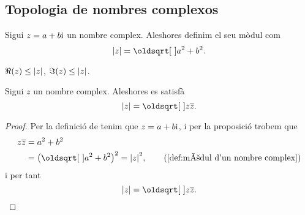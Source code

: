 \documentclass[../../Main.tex]{subfiles}
\begin{document}
	\subsection{Topologia de nombres complexos}
	\begin{definition}
        \label{def:mòdul d'un nombre complex}
		Sigui \(z = a+b\mathrm{i}\) un nombre complex.
        Aleshores definim el seu mòdul com
		\[
            \modul{z} = \sqrt{a^{2}+b^{2}}.
        \]
	\end{definition}
	\begin{observation}
		\label{obs:les parts real i imaginàries d'un complex són menors que el seu mòdul}
		\label{obs:la part real d'un complex és menor que el seu mòdul}
		\label{obs:la part imaginària d'un complex és menor que el seu mòdul}
		\(\Re(z) \leq \modul{z}\), \(\Im(z) \leq \modul{z}\).
	\end{observation}
	\begin{proposition}
		\label{prop:el mòdul d'un nombre complex és l'arrel del nombre pel seu conjugat}
		Sigui \(z\) un nombre complex.
        Aleshores es satisfà
		\[
            \modul{z} = \sqrt{z\conjugat{z}}.
        \]
		\begin{proof}
			Per la definició de  tenim
            que \(z = a+b\mathrm{i}\), i per la
            proposició 
            trobem que
			\begin{align*}
				z\conjugat{z} &= a^{2}+b^{2} \\
                              &= \big(\sqrt{a^{2}+b^{2}}\big)^{2}
                               = \modul{z}^{2},
                              \tag{\ref{def:mòdul d'un nombre complex}}
			\end{align*}
			i per tant 
			\[
                \modul{z} = \sqrt{z\conjugat{z}}.\qedhere
            \]
		\end{proof}
	\end{proposition}
\end{document}

